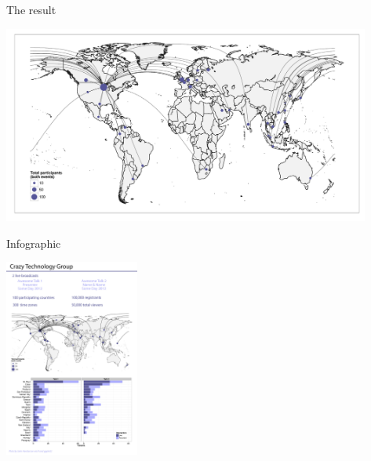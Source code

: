 \documentclass[sans,aspectratio=169,presentation,bigger,fleqn]{beamer}
\begin{document}
\begin{frame}[label=sec-20]{The result}
\normalsize


\begin{center}
\includegraphics[height=6.5cm]{./img/great-circles.pdf}
\end{center}
\end{frame}
\begin{frame}[label=sec-21]{Infographic}
\begin{center}
\includegraphics[height=6.5cm]{./img/infographic-flattened-lo.jpg}
\end{center}
\end{frame}
\end{document}

